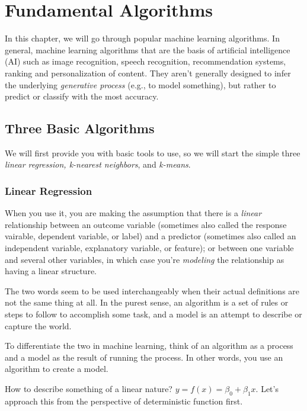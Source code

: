 \chapter{Fundamental Algorithms}
In this chapter, we will go through popular machine learning algorithms. In general, machine learning algorithms that are the basis of artificial intelligence (AI) such as image recognition, speech recognition, recommendation systems, ranking and personalization of content. They aren't generally designed to infer the underlying \textit{generative process} (e.g., to model something), but rather to predict or classify with the most accuracy.

\section{Three Basic Algorithms}
We will first provide you with basic tools to use, so we will start the simple three \textit{linear regression, k-nearest neighbors}, and \textit{k-means}.

\subsection{Linear Regression}
When you use it, you are making the assumption that there is a \textit{linear} relationship between an outcome variable (sometimes also called the response vairable, dependent variable, or label) and a predictor (sometimes also called an independent variable, explanatory variable, or feature); or between one variable and several other variables, in which case you're \textit{modeling} the relationship as having a linear structure.

\begin{tcolorbox}[enhanced jigsaw, breakable, pad at break*=1mm, colback=gray!20!white, colframe=black!85!black, title=\textbf{Algorithm or a Model?}]
    The two words seem to be used interchangeably when their actual definitions are not the same thing at all. In the purest sense, an algorithm is a set of rules or steps to follow to accomplish some task, and a model is an attempt to describe or capture the world.

    To differentiate the two in machine learning, think of an algorithm as a process and a model as the result of running the process. In other words, you use an algorithm to create a model.
\end{tcolorbox}

How to describe something of a linear nature? \(y=f(x)=\beta_{0}+\beta_{1}x\). Let's approach this from the perspective of deterministic function first.

